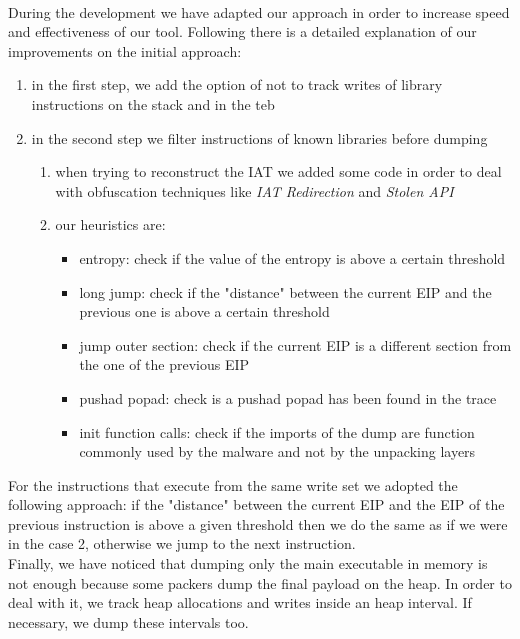 \paragraph{}
During the development we have adapted our approach in order to increase speed and effectiveness of our tool. Following there is a detailed explanation of our improvements on the initial approach:
\begin{enumerate}
\item in the first step, we add the option of not to track writes of library instructions on the stack and in the teb
\item in the second step we filter instructions of known libraries before dumping
	\begin{enumerate}
	\item when trying to reconstruct the IAT we added some code in order to deal with obfuscation techniques like \textit{IAT Redirection} and \textit{Stolen API}
	\item our heuristics are:
		\begin{itemize}
		\item entropy: check if the value of the entropy is above a certain threshold
		\item long jump: check if the "distance" between the current EIP and the previous one is above a certain threshold
		\item jump outer section: check if the current EIP is a different section from the one of the previous EIP
		\item pushad popad: check is a pushad popad has been found in the trace
		\item init function calls: check if the imports of the dump are function commonly used by the malware and not by the unpacking layers
		\end{itemize}
	\end{enumerate}
\end{enumerate} 
For the instructions that execute from the same write set we adopted the following approach: if the "distance" between the current EIP and the EIP of the previous instruction is above a given threshold then we do the same as if we were in the case 2, otherwise we jump to the next instruction.\\
Finally, we have noticed that dumping only the main executable in memory is not enough because some packers dump the final payload on the heap. In order to deal with it, we track heap allocations and writes inside an heap interval. If necessary, we dump these intervals too.
